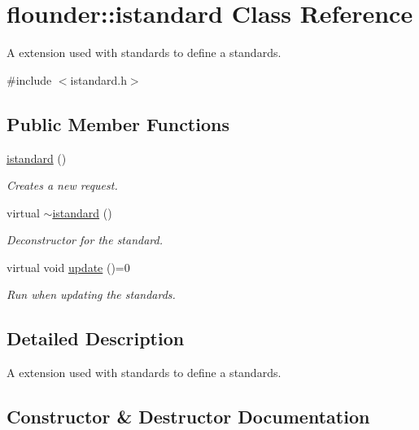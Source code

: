 \hypertarget{classflounder_1_1istandard}{}\section{flounder\+:\+:istandard Class Reference}
\label{classflounder_1_1istandard}


A extension used with standards to define a standards.  




{\ttfamily \#include $<$istandard.\+h$>$}

\subsection*{Public Member Functions}
\begin{DoxyCompactItemize}
\item 
\hyperlink{classflounder_1_1istandard_a3e10623255b491da0417c8eac2637993}{istandard} ()
\begin{DoxyCompactList}\small\item\em Creates a new request. \end{DoxyCompactList}\item 
virtual \hyperlink{classflounder_1_1istandard_a971c1469c6a0156351b31aa95ef61b34}{$\sim$istandard} ()
\begin{DoxyCompactList}\small\item\em Deconstructor for the standard. \end{DoxyCompactList}\item 
virtual void \hyperlink{classflounder_1_1istandard_a3297f71b53e925c6ab6536c2697f93fc}{update} ()=0
\begin{DoxyCompactList}\small\item\em Run when updating the standards. \end{DoxyCompactList}\end{DoxyCompactItemize}


\subsection{Detailed Description}
A extension used with standards to define a standards. 



\subsection{Constructor \& Destructor Documentation}
\mbox{\label{classflounder_1_1istandard_a3e10623255b491da0417c8eac2637993}} 
